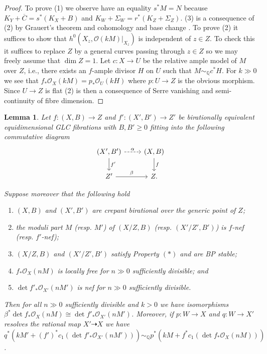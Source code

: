 \documentclass[12pt]{amsart}
\theoremstyle{plain}
\newtheorem{lemma}[theorem]{Lemma}
\theoremstyle{definition}
\def\dim{\operatorname{dim}}
\def\det{\operatorname{det}}
\begin{document}
\begin{proof}
To prove (1) we observe have an equality $s^*M = N$ because 
$K_Y+\overline{C} = s^*(K_X+B)$ and $K_W+\Sigma_W = r^*(K_Z+\Sigma_Z)$.
(3) is a consequence of (2) by Grauert's theorem and cohomology and base change \cite[Theorem III.12.8 and Corollary III.12.9]{Hartshorne77}.
To prove (2) it suffices to show that   $h^0(X_z, \mathcal O(kM)|_{X_z})$ is independent of $z \in Z$. 
To check this it suffices to replace $Z$ by a general curves passing through $z \in Z$ so we may freely assume
that $\dim Z = 1$.  Let $c\colon X \to U$ be the relative ample model of $M$ over $Z$, i.e., there exists an $f$-ample divisor $H$ on $U$ such that $M \sim_{\mathbb Q} c^*H$.  For $k \gg 0$ we see that $f_*\mathcal O_X(kM) = p_*\mathcal O_U(kH)$ where $p\colon U \to Z$ is the obvious morphism.  Since $U\to Z$ is flat (2) is then a consequence of Serre vanishing and semi-continuity of fibre dimension.
\end{proof}




\begin{lemma}
\label{lem_base_change_pushforward}
Let $f\colon (X, B) \rightarrow Z$ and $f'\colon (X', B') \rightarrow Z'$
be birationally equivalent equidimensional GLC fibrations with $B, B' \geq 0$
fitting into the following commutative diagram
\[
\begin{tikzcd}
  (X', B') \arrow[r, "\alpha", dashrightarrow] \arrow[d, "f'"] & (X, B) \arrow[d, "f"] \\
  Z' \arrow[r, "\beta"] &  Z.
 \end{tikzcd}
\]

Suppose moreover that the following hold
\begin{enumerate}
\item $(X, B)$ and $(X', B')$ are crepant birational over the generic point of $Z$;

\item the moduli part $M$ (resp. $M'$) of $(X/Z, B)$ (resp. $(X'/Z', B')$) is $f$-nef (resp. $f'$-nef);

\item $(X/Z, B)$ and $(X'/Z', B')$ satisfy Property $(*)$ and are BP stable;



\item $f_*\mathcal O_X(nM)$ is 
locally free for $n \gg 0$ sufficiently divisible; and

\item $\det f'_*\mathcal O_{X'}(nM')$ is nef for $n \gg 0$ sufficiently divisible.
\end{enumerate}


Then for all $n \gg 0$ sufficiently divisible and $k > 0$ we have
isomorphisms
 $\beta^*\det f_*\mathcal O_X(nM) \cong \det f'_*\mathcal O_{X'}(nM')$.  Moreover, if $p\colon W \rightarrow X$ and $q\colon W \rightarrow X'$
 resolves the rational map $X' \dashrightarrow X$ we have 
$q^*(kM'+(f')^*c_1(\det f'_*\mathcal O_{X'}(nM'))) \sim_{\mathbb Q} p^*(kM+f^*c_1(\det f_*\mathcal O_X(nM)))$.
\end{lemma}
\end{document}
